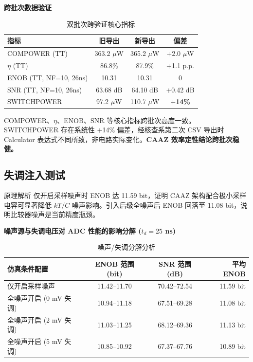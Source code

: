\documentclass[11pt,a4paper,UTF8]{ctexart}
\begin{document}
\textbf{跨批次数据验证}

\begin{table}[htbp]\centering\caption{双批次跨验证核心指标}\label{tab:cross2}\small
\begin{tabular}{lccc}\toprule
\textbf{指标} & \textbf{旧导出} & \textbf{新导出} & \textbf{偏差} \\\midrule
COMPOWER (TT) & 363.2 $\mu$W & 365.2 $\mu$W & $+$2.0 $\mu$W \\
$\eta$ (TT) & 86.8\% & 87.9\% & $+$1.1 p.p. \\
ENOB (TT, NF=10, 26ns) & 10.31 & 10.31 & 0 \\
SNR (TT, NF=10, 26ns) & 63.68 dB & 64.10 dB & $+$0.42 dB \\
SWITCHPOWER & 97.2 $\mu$W & 110.7 $\mu$W & \textbf{$+$14\%} \\\bottomrule
\end{tabular}
\end{table}

COMPOWER、$\eta$、ENOB、SNR 等核心指标跨批次高度一致。SWITCHPOWER 存在系统性 $+$14\% 偏差，经核查系第二次 CSV 导出时 Calculator 表达式不同所致，非电路实际变化。\textbf{CAAZ 效率定性结论跨批次稳健。}

\subsection{失调注入测试}

\begin{prinbox}{原理解析}
仅开启采样噪声时 ENOB 达 11.59 bit，证明 CAAZ 架构配合极小采样电容可显著降低 $kT/C$ 噪声影响。引入后级全噪声后 ENOB 回落至 11.08 bit，说明比较器噪声是当前精度瓶颈。
\end{prinbox}

\textbf{噪声源与失调电压对 ADC 性能的影响分解 ($t_d = 25$ ns)}

\begin{table}[htbp]\centering\caption{噪声/失调分解分析}\label{tab:offset}\small
\begin{tabular}{lccr}\toprule
\textbf{仿真条件配置} & \textbf{ENOB 范围 (bit)} & \textbf{SNR 范围 (dB)} & \textbf{平均 ENOB} \\\midrule
仅开启采样噪声 & 11.42--11.70 & 70.42--72.54 & 11.59 bit \\
全噪声开启 (0 mV 失调) & 10.94--11.18 & 67.51--69.28 & 11.08 bit \\
全噪声开启 (2 mV 失调) & 11.03--11.25 & 68.12--69.36 & 11.13 bit \\
全噪声开启 (5 mV 失调) & 10.85--10.92 & 67.37--67.76 & 10.89 bit \\\bottomrule
\end{tabular}
\end{table}
\end{document}
